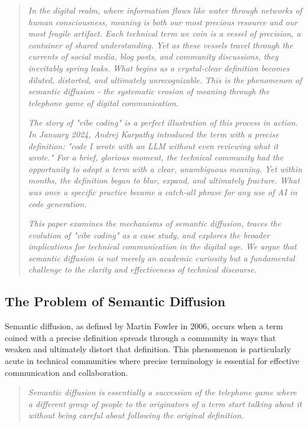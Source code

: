 \documentclass[11pt]{article}
\begin{document}
\begin{quote}
\emph{In the digital realm, where information flows like water through networks of human consciousness, meaning is both our most precious resource and our most fragile artifact. Each technical term we coin is a vessel of precision, a container of shared understanding. Yet as these vessels travel through the currents of social media, blog posts, and community discussions, they inevitably spring leaks. What begins as a crystal-clear definition becomes diluted, distorted, and ultimately unrecognizable. This is the phenomenon of semantic diffusion - the systematic erosion of meaning through the telephone game of digital communication.}

\emph{The story of "vibe coding" is a perfect illustration of this process in action. In January 2024, Andrej Karpathy introduced the term with a precise definition: "code I wrote with an LLM without even reviewing what it wrote." For a brief, glorious moment, the technical community had the opportunity to adopt a term with a clear, unambiguous meaning. Yet within months, the definition began to blur, expand, and ultimately fracture. What was once a specific practice became a catch-all phrase for any use of AI in code generation.}

\emph{This paper examines the mechanisms of semantic diffusion, traces the evolution of "vibe coding" as a case study, and explores the broader implications for technical communication in the digital age. We argue that semantic diffusion is not merely an academic curiosity but a fundamental challenge to the clarity and effectiveness of technical discourse.}
\end{quote}

\subsection{The Problem of Semantic Diffusion}

Semantic diffusion, as defined by Martin Fowler in 2006, occurs when a term coined with a precise definition spreads through a community in ways that weaken and ultimately distort that definition. This phenomenon is particularly acute in technical communities where precise terminology is essential for effective communication and collaboration.

\begin{quote}
\emph{Semantic diffusion is essentially a succession of the telephone game where a different group of people to the originators of a term start talking about it without being careful about following the original definition.}
\end{quote}
\end{document}
